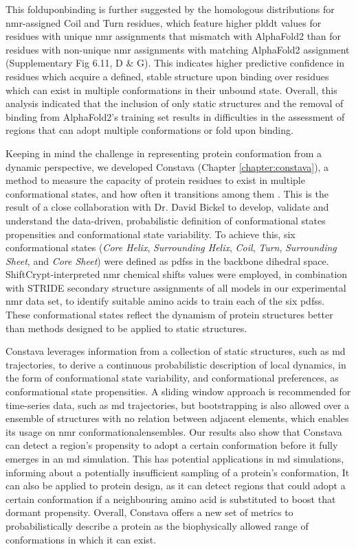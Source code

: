 This \gls{folduponbinding} is further suggested by the homologous distributions for \gls{nmr}-assigned Coil and Turn residues, which feature higher \gls{plddt} values for residues with unique \gls{nmr} assignments that mismatch with AlphaFold2 than for residues with non-unique \gls{nmr} assignments with matching AlphaFold2 assignment (Supplementary Fig 6.11, D \& G). This indicates higher predictive confidence in residues which acquire a defined, stable structure upon binding over residues which can exist in multiple \glspl{conformation} in their unbound state. Overall, this analysis indicated that the inclusion of only static structures and the removal of binding from AlphaFold2's training set results in difficulties in the assessment of regions that can adopt multiple \glspl{conformation} or fold upon binding. 

Keeping in mind the challenge in representing protein \gls{conformation} from a dynamic perspective, we developed Constava (Chapter \ref{chapter:constava}), a method to measure the capacity of protein residues to exist in multiple conformational states, and how often it transitions among them \cite{gavalda-garcia_data-driven_2024}. This is the result of a close collaboration with Dr. David Bickel to develop, validate and understand the data-driven, probabilistic definition of conformational states propensities and conformational state variability. To achieve this, six conformational states (\textit{Core Helix}, \textit{Surrounding Helix}, \textit{Coil}, \textit{Turn}, \textit{Surrounding Sheet}, and \textit{Core Sheet}) were defined as \glspl{pdf}s in the backbone dihedral space. ShiftCrypt-interpreted \gls{nmr} chemical shifts \cite{orlando_shiftcrypt_2020} values were employed, in combination with STRIDE \cite{frishman_knowledge-based_1995} secondary structure assignments of all models in our experimental \gls{nmr} data set, to identify suitable amino acids to train each of the six \glspl{pdf}s. These conformational states reflect the dynamism of protein structures better than methods designed to be applied to static structures.


Constava leverages information from a collection of static structures, such as \gls{md} trajectories, to derive a continuous probabilistic description of local \gls{dynamics}, in the form of conformational state variability, and conformational preferences, as conformational state propensities. A sliding window approach is recommended for time-series data, such as \gls{md} trajectories, but bootstrapping is also allowed over a ensemble of structures with no relation between adjacent elements, which enables its usage on \gls{nmr} \glspl{conformationalensemble}. Our results also show that Constava can detect a region's propensity to adopt a certain \gls{conformation} before it fully emerges in an \gls{md} simulation. This has potential applications in \gls{md} simulations, informing about a potentially insufficient sampling of a protein's \gls{conformation}, It can also be applied to protein design, as it can detect regions that could adopt a certain \gls{conformation} if a neighbouring amino acid is substituted to boost that dormant propensity. Overall, Constava offers a new set of metrics to probabilistically describe a protein as the biophysically allowed range of \glspl{conformation} in which it can exist.
